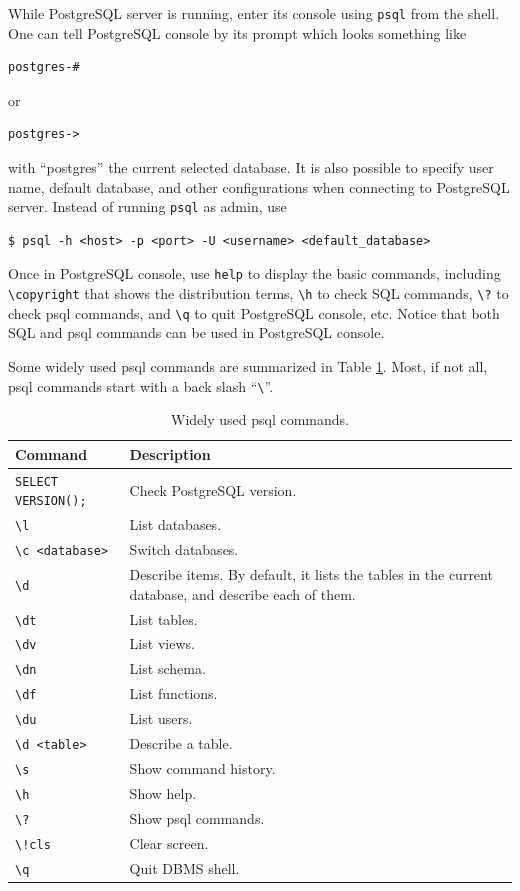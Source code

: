 While PostgreSQL server is running, enter its console using \verb|psql| from the shell. One can tell PostgreSQL console by its prompt which looks something like
\begin{lstlisting}
postgres-#
\end{lstlisting}
or
\begin{lstlisting}
postgres->
\end{lstlisting}
with ``postgres'' the current selected database. It is also possible to specify user name, default database, and other configurations when connecting to PostgreSQL server. Instead of running \verb|psql| as admin, use
\begin{lstlisting}
$ psql -h <host> -p <port> -U <username> <default_database>
\end{lstlisting}

Once in PostgreSQL console, use \verb|help| to display the basic commands, including \verb|\copyright| that shows the distribution terms, \verb|\h| to check SQL commands, \verb|\?| to check psql commands, and \verb|\q| to quit PostgreSQL console, etc. Notice that both SQL and psql commands can be used in PostgreSQL console.

Some widely used psql commands are summarized in Table \ref{ch:db:tab:psqlcommands}. Most, if not all, psql commands start with a back slash ``\verb|\|''.

\begin{table}
	\centering \caption{Widely used psql commands.}\label{ch:db:tab:psqlcommands}
	\begin{tabularx}{\textwidth}{lX}
		\hline
		Command & Description \\ \hline
		\verb|SELECT VERSION();| & Check PostgreSQL version. \\ \hdashline
		\verb|\l| & List databases. \\ \hdashline
		\verb|\c <database>| & Switch databases. \\ \hdashline
		\verb|\d| & Describe items. By default, it lists the tables in the current database, and describe each of them. \\ \hdashline
		\verb|\dt| & List tables. \\ \hdashline
		\verb|\dv| & List views. \\ \hdashline
		\verb|\dn| & List schema. \\ \hdashline
		\verb|\df| & List functions. \\ \hdashline
		\verb|\du| & List users. \\ \hdashline
		\verb|\d <table>| & Describe a table. \\ \hdashline
		\verb|\s| & Show command history. \\ \hdashline
		\verb|\h| & Show help. \\ \hdashline
		\verb|\?| & Show psql commands. \\ \hdashline
		\verb|\!cls| & Clear screen. \\ \hdashline
		\verb|\q| & Quit DBMS shell. \\
		\hline
	\end{tabularx}
\end{table}

